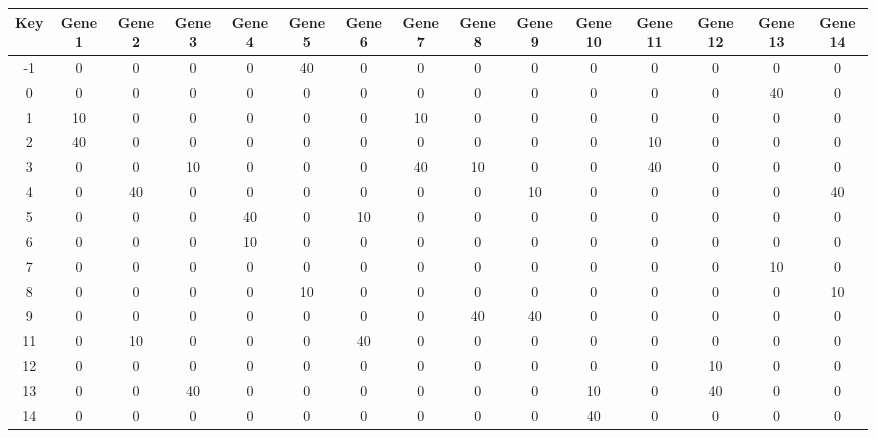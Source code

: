\begin{tabular}{|c|c|c|c|c|c|c|c|c|c|c|c|c|c|c|}
\hline
Key & Gene 1 & Gene 2 & Gene 3 & Gene 4 & Gene 5 & Gene 6 & Gene 7 & Gene 8 & Gene 9 & Gene 10 & Gene 11 & Gene 12 & Gene 13 & Gene 14 \\
\hline
-1 & 0 & 0 & 0 & 0 & 40 & 0 & 0 & 0 & 0 & 0 & 0 & 0 & 0 & 0 \\
0 & 0 & 0 & 0 & 0 & 0 & 0 & 0 & 0 & 0 & 0 & 0 & 0 & 40 & 0 \\
1 & 10 & 0 & 0 & 0 & 0 & 0 & 10 & 0 & 0 & 0 & 0 & 0 & 0 & 0 \\
2 & 40 & 0 & 0 & 0 & 0 & 0 & 0 & 0 & 0 & 0 & 10 & 0 & 0 & 0 \\
3 & 0 & 0 & 10 & 0 & 0 & 0 & 40 & 10 & 0 & 0 & 40 & 0 & 0 & 0 \\
4 & 0 & 40 & 0 & 0 & 0 & 0 & 0 & 0 & 10 & 0 & 0 & 0 & 0 & 40 \\
5 & 0 & 0 & 0 & 40 & 0 & 10 & 0 & 0 & 0 & 0 & 0 & 0 & 0 & 0 \\
6 & 0 & 0 & 0 & 10 & 0 & 0 & 0 & 0 & 0 & 0 & 0 & 0 & 0 & 0 \\
7 & 0 & 0 & 0 & 0 & 0 & 0 & 0 & 0 & 0 & 0 & 0 & 0 & 10 & 0 \\
8 & 0 & 0 & 0 & 0 & 10 & 0 & 0 & 0 & 0 & 0 & 0 & 0 & 0 & 10 \\
9 & 0 & 0 & 0 & 0 & 0 & 0 & 0 & 40 & 40 & 0 & 0 & 0 & 0 & 0 \\
11 & 0 & 10 & 0 & 0 & 0 & 40 & 0 & 0 & 0 & 0 & 0 & 0 & 0 & 0 \\
12 & 0 & 0 & 0 & 0 & 0 & 0 & 0 & 0 & 0 & 0 & 0 & 10 & 0 & 0 \\
13 & 0 & 0 & 40 & 0 & 0 & 0 & 0 & 0 & 0 & 10 & 0 & 40 & 0 & 0 \\
14 & 0 & 0 & 0 & 0 & 0 & 0 & 0 & 0 & 0 & 40 & 0 & 0 & 0 & 0 \\
\hline
\end{tabular}